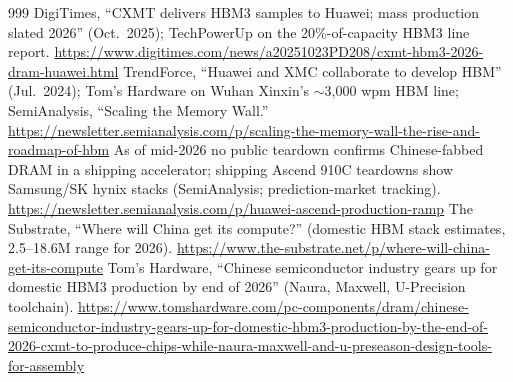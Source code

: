 \begin{thebibliography}{999}
 DigiTimes, ``CXMT delivers HBM3 samples to Huawei; mass production slated 2026'' (Oct.\ 2025); TechPowerUp on the 20\%-of-capacity HBM3 line report. \url{https://www.digitimes.com/news/a20251023PD208/cxmt-hbm3-2026-dram-huawei.html}
 TrendForce, ``Huawei and XMC collaborate to develop HBM'' (Jul.\ 2024); Tom's Hardware on Wuhan Xinxin's $\sim$3,000 wpm HBM line; SemiAnalysis, ``Scaling the Memory Wall.'' \url{https://newsletter.semianalysis.com/p/scaling-the-memory-wall-the-rise-and-roadmap-of-hbm}
 As of mid-2026 no public teardown confirms Chinese-fabbed DRAM in a shipping accelerator; shipping Ascend 910C teardowns show Samsung/SK hynix stacks (SemiAnalysis; prediction-market tracking). \url{https://newsletter.semianalysis.com/p/huawei-ascend-production-ramp}
 The Substrate, ``Where will China get its compute?'' (domestic HBM stack estimates, 2.5--18.6M range for 2026). \url{https://www.the-substrate.net/p/where-will-china-get-its-compute}
 Tom's Hardware, ``Chinese semiconductor industry gears up for domestic HBM3 production by end of 2026'' (Naura, Maxwell, U-Precision toolchain). \url{https://www.tomshardware.com/pc-components/dram/chinese-semiconductor-industry-gears-up-for-domestic-hbm3-production-by-the-end-of-2026-cxmt-to-produce-chips-while-naura-maxwell-and-u-preseason-design-tools-for-assembly}


\end{thebibliography}

